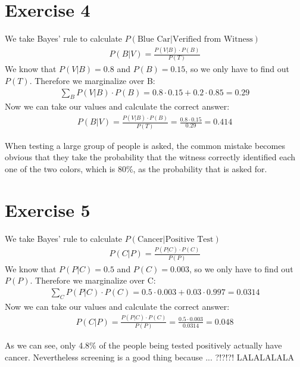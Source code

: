 \documentclass{article}
\begin{document}
\section*{Exercise 4}
We take Bayes' rule to calculate $P(\mbox{Blue Car}|\mbox{Verified from Witness})$
\begin{align}
P(B|V) = \frac{P(V|B) \cdot P(B)}{P(T)}
\end{align}
We know that $P(V|B) = 0.8$ and $P(B) = 0.15$, so we only have to find out $P(T)$. Therefore we marginalize over B:
\begin{align}
\sum_{B}{P(V|B) \cdot P(B)} = 0.8 \cdot 0.15 + 0.2 \cdot 0.85 = 0.29
\end{align}
Now we can take our values and calculate the correct answer:
\begin{align}
P(B|V) = \frac{P(V|B) \cdot P(B)}{P(T)} = \frac{0.8 \cdot 0.15}{0.29} = 0.414
\end{align}

When testing a large group of people is asked, the common mistake becomes obvious that they take the probability that the witness correctly identified each one of the two colors, which is 80\%, as the probability that is asked for.

\setcounter{equation}{0}
\section*{Exercise 5}

We take Bayes' rule to calculate $P(\mbox{Cancer}|\mbox{Positive Test})$
\begin{align}
P(C|P) = \frac{P(P|C) \cdot P(C)}{P(P)}
\end{align}
We know that $P(P|C) = 0.5$ and $P(C) = 0.003$, so we only have to find out $P(P)$. Therefore we marginalize over C:
\begin{align}
\sum_{C}{P(P|C) \cdot P(C)} = 0.5 \cdot 0.003 + 0.03 \cdot 0.997 = 0.0314
\end{align}
Now we can take our values and calculate the correct answer:
\begin{align}
P(C|P) = \frac{P(P|C) \cdot P(C)}{P(P)} = \frac{0.5 \cdot 0.003}{0.0314} = 0.048
\end{align}

As we can see, only 4.8\% of the people being tested positively actually have cancer. Nevertheless screening is a good thing because ... ?!?!?! LALALALALA
\end{document}
